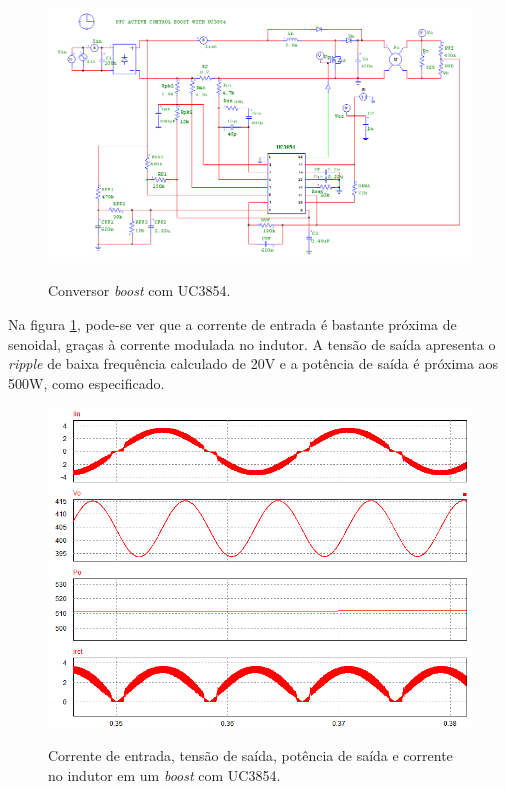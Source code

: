 \documentclass[
        12pt,
        openany, %
        oneside, %
        a4paper,			
        english,			
        brazil
        ]{abntbibufjf}
\begin{document}
\begin{figure}[!h]
	\centering
	\caption{Conversor \textit{boost} com UC3854.}
	\includegraphics[scale=.6]{../ESQUEMAS/PFC_BOOST.PNG}\\
	\label{psim_boost}
\end{figure}

Na figura \ref{psim_boost}, pode-se ver que a corrente de entrada é bastante próxima de senoidal, graças à corrente modulada no indutor. A tensão de saída apresenta o \textit{ripple} de baixa frequência calculado de 20V e a potência de saída é próxima aos 500W, como especificado.

\begin{figure}[!h]
	\centering
	\caption{Corrente de entrada, tensão de saída, potência de saída e corrente no indutor em um \textit{boost} com UC3854.}
	\includegraphics[scale=.5]{../GRAFICOS/pfc_output.PNG}\\
	\label{pfc_output}
\end{figure}
\end{document}
